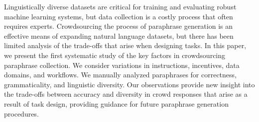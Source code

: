 Linguistically diverse datasets are critical for training and evaluating robust machine learning systems, but data collection is a costly process that often requires experts. Crowdsourcing the process of paraphrase generation is an effective means of expanding natural language datasets, but there has been limited analysis of the trade-offs that arise when designing tasks. In this paper, we present the first systematic study of the key factors in crowdsourcing paraphrase collection. We consider variations in instructions, incentives, data domains, and workflows. We manually analyzed paraphrases for correctness, grammaticality, and linguistic diversity. Our observations provide new insight into the trade-offs between accuracy and diversity in crowd responses that arise as a result of task design, providing guidance for future paraphrase generation procedures.
